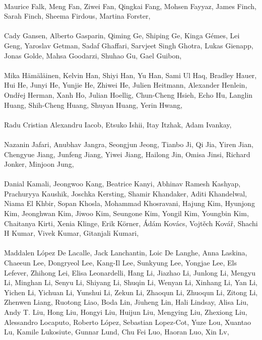 \paragraph{}Maurice Falk, Meng Fan, Ziwei Fan, Qingkai Fang, Mohsen Fayyaz, James Finch, Sarah Finch, Sheema Firdous, Martina Forster,
\paragraph{}Cady Gansen, Alberto Gasparin, Qiming Ge, Shiping Ge, Kinga Gémes, Lei Geng, Yaroslav Getman, Sadaf Ghaffari, Sarvjeet Singh Ghotra, Lukas Gienapp, Jonas Golde, Mahsa Goodarzi, Shuhao Gu, Gael Guibon,
\paragraph{}Mika Hämäläinen, Kelvin Han, Shiyi Han, Yu Han, Sami Ul Haq, Bradley Hauer, Hui He, Junyi He, Yunjie He, Zhiwei He, Julien Heitmann, Alexander Henlein, Ondřej Herman, Xanh Ho, Julian Hoellig, Chun-Cheng Hsieh, Echo Hu, Langlin Huang, Shih-Cheng Huang, Shuyan Huang, Yerin Hwang,
\paragraph{}Radu Cristian Alexandru Iacob, Etsuko Ishii, Itay Itzhak, Adam Ivankay,
\paragraph{}Nazanin Jafari, Anubhav Jangra, Seongjun Jeong, Tianbo Ji, Qi Jia, Yiren Jian, Chengyue Jiang, Junfeng Jiang, Yiwei Jiang, Hailong Jin, Omisa Jinsi, Richard Jonker, Minjoon Jung,
\paragraph{}Danial Kamali, Jeongwoo Kang, Beatrice Kanyi, Abhinav Ramesh Kashyap, Prachuryya Kaushik, Joschka Kersting, Shamir Khandaker, Aditi Khandelwal, Niama El Khbir, Sopan Khosla, Mohammad Khosravani, Hajung Kim, Hyunjong Kim, Jeonghwan Kim, Jiwoo Kim, Seungone Kim, Yongil Kim, Youngbin Kim, Chaitanya Kirti, Xenia Klinge, Erik Körner, Ádám Kovács, Vojtěch Kovář, Shachi H Kumar, Vivek Kumar, Gitanjali Kumari,
\paragraph{}Maddalen López De Lacalle, Jack Lanchantin, Loic De Langhe, Anna Laskina, Chaeeun Lee, Dongryeol Lee, Kang-Il Lee, Sunkyung Lee, Yongjae Lee, Els Lefever, Zhihong Lei, Elisa Leonardelli, Hang Li, Jiazhao Li, Junlong Li, Mengyu Li, Minghan Li, Senyu Li, Shiyang Li, Shuqin Li, Wenyan Li, Xinhang Li, Yan Li, Yichen Li, Yichuan Li, Yunshui Li, Zekun Li, Zhaoqun Li, Zhuoqun Li, Zitong Li, Zhenwen Liang, Ruotong Liao, Boda Lin, Jiuheng Lin, Hali Lindsay, Alisa Liu, Andy T. Liu, Hong Liu, Hongyi Liu, Huijun Liu, Mengying Liu, Zhexiong Liu, Alessandro Locaputo, Roberto López, Sebastian Lopez-Cot, Yuze Lou, Xuantao Lu, Kamile Lukosiute, Gunnar Lund, Chu Fei Luo, Haoran Luo, Xin Lv,
